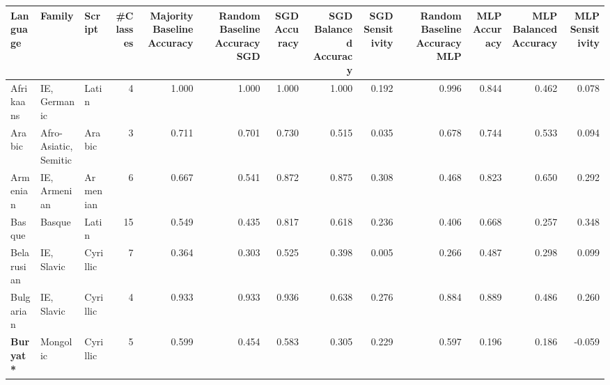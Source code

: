 \begin{tabular}{lllrrrrrrrrrr}
\toprule
               Language &                          Family &     Script &  #Classes &  Majority Baseline Accuracy &  Random Baseline Accuracy SGD &  SGD Accuracy &  SGD Balanced Accuracy &  SGD Sensitivity &  Random Baseline Accuracy MLP &  MLP Accuracy &  MLP Balanced Accuracy &  MLP Sensitivity \\
\midrule
              Afrikaans &                    IE, Germanic &      Latin &         4 &                       1.000 &                         1.000 &         1.000 &                  1.000 &            0.192 &                         0.996 &         0.844 &                  0.462 &            0.078 \\
                 Arabic &           Afro-Asiatic, Semitic &     Arabic &         3 &                       0.711 &                         0.701 &         0.730 &                  0.515 &            0.035 &                         0.678 &         0.744 &                  0.533 &            0.094 \\
               Armenian &                    IE, Armenian &   Armenian &         6 &                       0.667 &                         0.541 &         0.872 &                  0.875 &            0.308 &                         0.468 &         0.823 &                  0.650 &            0.292 \\
                 Basque &                          Basque &      Latin &        15 &                       0.549 &                         0.435 &         0.817 &                  0.618 &            0.236 &                         0.406 &         0.668 &                  0.257 &            0.348 \\
             Belarusian &                      IE, Slavic &   Cyrillic &         7 &                       0.364 &                         0.303 &         0.525 &                  0.398 &            0.005 &                         0.266 &         0.487 &                  0.298 &            0.099 \\
              Bulgarian &                      IE, Slavic &   Cyrillic &         4 &                       0.933 &                         0.933 &         0.936 &                  0.638 &            0.276 &                         0.884 &         0.889 &                  0.486 &            0.260 \\
       \textbf{Buryat*} &                        Mongolic &   Cyrillic &         5 &                       0.599 &                         0.454 &         0.583 &                  0.305 &            0.229 &                         0.597 &         0.196 &                  0.186 &           -0.059 \\

\end{tabular}
